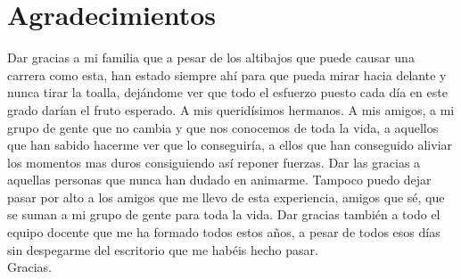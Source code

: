 \chapter*{Agradecimientos}

Dar gracias a mi familia que a pesar de los altibajos que puede causar una carrera como esta, han estado siempre ahí para que pueda mirar hacia delante y nunca tirar la toalla, dejándome ver que todo el esfuerzo puesto cada día en este grado darían el fruto esperado. A mis queridísimos hermanos. A mis amigos, a mi grupo de gente que no cambia y que nos conocemos de toda la vida, a aquellos que han sabido hacerme ver que lo conseguiría, a ellos que han conseguido aliviar los momentos mas duros consiguiendo así reponer fuerzas. Dar las gracias a aquellas personas que nunca han dudado en animarme. Tampoco puedo dejar pasar por alto a los amigos que me llevo de esta experiencia, amigos que sé, que se suman a mi grupo de gente para toda la vida. Dar gracias también a todo el equipo docente que me ha formado todos estos años, a pesar de todos esos días sin despegarme del escritorio que me habéis hecho pasar. \\

Gracias.